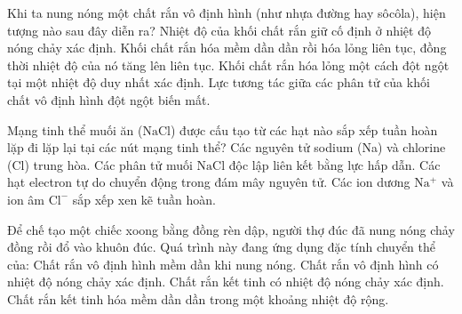 \begin{ex}
	Khi ta nung nóng một chất rắn vô định hình (như nhựa đường hay sôcôla), hiện tượng nào sau đây diễn ra?
	\choice
	{Nhiệt độ của khối chất rắn giữ cố định ở nhiệt độ nóng chảy xác định.}
	{\True Khối chất rắn hóa mềm dần dần rồi hóa lỏng liên tục, đồng thời nhiệt độ của nó tăng lên liên tục.}
	{Khối chất rắn hóa lỏng một cách đột ngột tại một nhiệt độ duy nhất xác định.}
	{Lực tương tác giữa các phân tử của khối chất vô định hình đột ngột biến mất.}
\end{ex}

\begin{ex}
	Mạng tinh thể muối ăn ($ \mathrm{NaCl} $) được cấu tạo từ các hạt nào sắp xếp tuần hoàn lặp đi lặp lại tại các nút mạng tinh thể?
	\choice
	{Các nguyên tử sodium (Na) và chlorine (Cl) trung hòa.}
	{Các phân tử muối $ \mathrm{NaCl} $ độc lập liên kết bằng lực hấp dẫn.}
	{Các hạt electron tự do chuyển động trong đám mây nguyên tử.}
	{\True Các ion dương $ \mathrm{Na^+} $ và ion âm $ \mathrm{Cl^-} $ sắp xếp xen kẽ tuần hoàn.}
\end{ex}

\begin{ex}
	Để chế tạo một chiếc xoong bằng đồng rèn dập, người thợ đúc đã nung nóng chảy đồng rồi đổ vào khuôn đúc. Quá trình này đang ứng dụng đặc tính chuyển thể của:
	\choice
	{Chất rắn vô định hình mềm dần khi nung nóng.}
	{Chất rắn vô định hình có nhiệt độ nóng chảy xác định.}
	{\True Chất rắn kết tinh có nhiệt độ nóng chảy xác định.}
	{Chất rắn kết tinh hóa mềm dần dần trong một khoảng nhiệt độ rộng.}
\end{ex}

